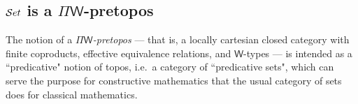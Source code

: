 %
%
%


\subsection{\texorpdfstring{$\mathcal{S}et$}{Set} is a \texorpdfstring{$\Pi$}{Π}$\mathsf{W}$-pretopos}
\label{subsec:piw}

The notion of a \emph{$\Pi\mathsf{W}$-pretopos} --- that is, a locally cartesian closed category with finite coproducts, effective equivalence relations, and $\mathsf{W}$-types --- is intended as a ``predicative" notion of topos, i.e.\ a category of ``predicative sets", which can serve the purpose for constructive mathematics that the usual category of sets does for classical mathematics.  

